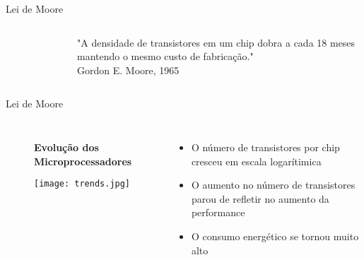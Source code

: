 \begin{frame}[t]{Lei de Moore}
        \begin{columns}
                \begin{figure}
                \end{figure}
            \LARGE
            "A densidade de transistores em um chip dobra a cada 18 meses mantendo o mesmo custo de fabricação."\\
            Gordon E. Moore, 1965
        \end{columns}
\end{frame}
\begin{frame}[t]{Lei de Moore}
    \begin{columns}
        \begin{figure}
            \centering
            \textbf{Evolução dos Microprocessadores}\par\medskip
            \texttt{[image: trends.jpg]}
        \end{figure}
        \large{
        \begin{itemize}
            \item O número de transistores por chip cresceu em escala logarítimica\\
            \item O aumento no número de transistores parou de refletir no aumento da performance\\
            \item O consumo energético se tornou muito alto
        \end{itemize}
        }
    \end{columns}
    
\end{frame}
